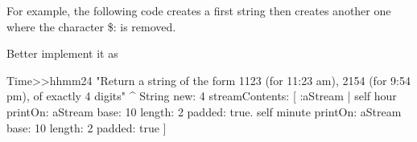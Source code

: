 \documentclass[a4paper,10pt,twoside]{book}
\begin{document}
For example, the following code creates a first string then creates another one where the character \$: is removed.  


Better implement it as 


\begin{code}{}
Time>>hhmm24
 	"Return a string of the form 1123 (for 11:23 am), 2154 (for 9:54 pm), of exactly 4 digits"
 	^ String new: 4 streamContents: [ :aStream | 
		self hour printOn: aStream base: 10 length: 2 padded: true.
		self minute printOn: aStream base: 10 length: 2 padded: true ]
\end{code}





\ifx\wholebook\relax\else
\end{document}
